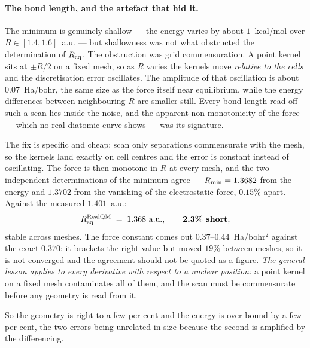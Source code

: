 \paragraph{The bond length, and the artefact that hid it.}
The minimum is genuinely shallow --- the energy varies by about $1$~kcal/mol over
$R \in [1.4, 1.6]$~a.u. --- but shallowness was not what obstructed the determination of $R_{\rm
eq}$. The obstruction was grid commensuration. A point kernel sits at $\pm R/2$ on a fixed mesh, so
as $R$ varies the kernels move \emph{relative to the cells} and the discretisation error
oscillates. The amplitude of that oscillation is about $0.07$~Ha/bohr, the same size as the force
itself near equilibrium, while the energy differences between neighbouring $R$ are smaller still.
Every bond length read off such a scan lies inside the noise, and the apparent non-monotonicity of
the force --- which no real diatomic curve shows --- was its signature.

The fix is specific and cheap: scan only separations commensurate with the mesh, so the kernels land
exactly on cell centres and the error is constant instead of oscillating. The force is then monotone
in $R$ at every mesh, and the two independent determinations of the minimum agree ---
$R_{\rm min} = 1.3682$ from the energy and $1.3702$ from the vanishing of the electrostatic force,
$0.15\%$ apart. Against the measured $1.401$~a.u.:
\[
R_{\rm eq}^{\rm RealQM} \;=\; 1.368 \text{ a.u.}, \qquad \textbf{2.3\% short},
\]
stable across meshes. The force constant comes out $0.37$--$0.44$~Ha/bohr$^2$ against the exact
$0.370$: it brackets the right value but moved $19\%$ between meshes, so it is not converged and
the agreement should not be quoted as a figure. \emph{The general lesson applies to every
derivative with respect to a nuclear position:} a point kernel on a fixed mesh contaminates all of
them, and the scan must be commensurate before any geometry is read from it.

So the geometry is right to a few per cent and the energy is over-bound by a few per cent, the two
errors being unrelated in size because the second is amplified by the differencing.

